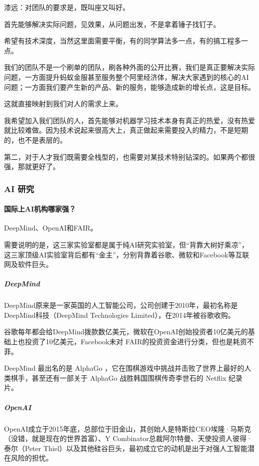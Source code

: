 \documentclass[letterpaper,11pt,english]{sphinxmanual}
\begin{document}
漆远：对团队的要求是，既叫座又叫好。

首先能够解决实际问题，见效果，从问题出发，不是拿着锤子找钉子。

希望有技术深度，当然这里面需要平衡，有的同学算法多一点，有的搞工程多一点。

我们的团队不是一个刷单的团队，刷各种外面的公开比赛，我们是真正要解决实际问题，一方面提升蚂蚁金服甚至服务整个阿里经济体，解决大家遇到的核心的AI问题；一方面我们要产生新的产品、新的服务，能够造成新的增长点，这是目标。

这就直接映射到我们对人的需求上来。

我希望加入我们团队的人，首先能够对机器学习技术本身有真正的热爱，没有热爱就比较难做。因为技术说起来很高大上，真正做起来需要投入的精力，不是短期的，也不是表层的。

第二，对于人才我们既需要全栈型的，也需要对某技术特别钻深的。如果两个都很强，那就更好了。


\subsubsection{AI 研究}
\label{\detokenize{chapter_AI_dive/AI_Research:ai}}\label{\detokenize{chapter_AI_dive/AI_Research::doc}}

\paragraph{国际上AI机构哪家强？}
\label{\detokenize{chapter_AI_dive/AI_Research:id1}}
DeepMind、OpenAI和FAIR。

需要说明的是，这三家实验室都是属于纯AI研究实验室，但“背靠大树好乘凉”，这三家顶级AI实验室背后都有“金主”，分别背靠着谷歌、微软和Facebook等互联网及软件巨头。


\subparagraph{DeepMind}
\label{\detokenize{chapter_AI_dive/AI_Research:deepmind}}
DeepMind原来是一家英国的人工智能公司，公司创建于2010年，最初名称是DeepMind科技（DeepMind
Technologies Limited），在2014年被谷歌收购。

谷歌每年都会给DeepMind拨款数亿美元，微软在OpenAI创始投资者10亿美元的基础上也投资了10亿美元，Facebook未对
FAIR的投资资金进行分类，但也是耗资不菲。

DeepMind 最出名的是 AlphaGo
，它在围棋游戏中挑战并击败了世界上最好的人类棋手，甚至还有一部关于
AlphaGo 战胜韩国围棋传奇李世石的 Netflix 纪录片。


\subparagraph{OpenAI}
\label{\detokenize{chapter_AI_dive/AI_Research:openai}}
OpenAI成立于2015年底，总部位于旧金山，其创始人是特斯拉CEO埃隆·马斯克（没错，就是现在的世界首富）、Y
Combinator总裁阿尔特曼、天使投资人彼得·泰尔（Peter
Thiel）以及其他硅谷巨头，最初成立它的动机是出于对强人工智能潜在风险的担忧。
\end{document}
